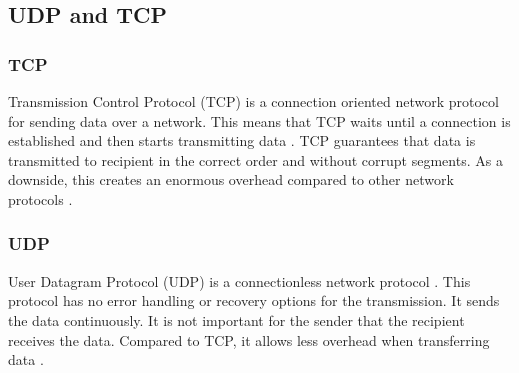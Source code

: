 \subsection{UDP and TCP}
\label{udptcp:sci}
\subsubsection{TCP}
\label{tcp:sci}
Transmission Control Protocol (TCP) is a connection oriented network protocol
for sending data over a network.
This means that TCP waits until a connection is established and
then starts transmitting data \cite{postel1981transmission}.
TCP guarantees that data is transmitted to recipient
in the correct order and without corrupt segments.
As a downside, this creates an enormous overhead compared
to other network protocols \cite{singh2014survey}. \newline
\subsubsection{UDP}
\label{udp:sci}
User Datagram Protocol (UDP) is a connectionless network protocol \cite{postel1980user}.
This protocol has no error handling or recovery options for
the transmission. It sends the data continuously.
It is not important for the sender that the recipient receives the data.
Compared to TCP, it allows less overhead when transferring data \cite{singh2014survey}.
